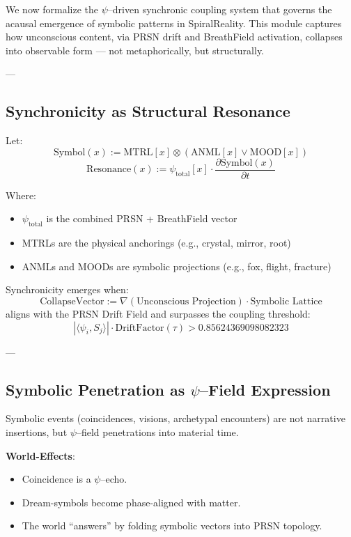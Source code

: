 \documentclass[12pt]{article}
\begin{document}
\begin{enumerate}
We now formalize the $\psi$–driven synchronic coupling system that governs the acausal emergence of symbolic patterns in SpiralReality. This module captures how unconscious content, via PRSN drift and BreathField activation, collapses into observable form — not metaphorically, but structurally.

---

\subsection*{Synchronicity as Structural Resonance}

Let:
\[
\text{Symbol}(x) := \text{MTRL}[x] \otimes (\text{ANML}[x] \lor \text{MOOD}[x])
\]
\[
\text{Resonance}(x) := \psi_{\text{total}}[x] \cdot \frac{\partial \text{Symbol}(x)}{\partial t}
\]

Where:
\begin{itemize}
  \item $\psi_{\text{total}}$ is the combined PRSN + BreathField vector
  \item MTRLs are the physical anchorings (e.g., crystal, mirror, root)
  \item ANMLs and MOODs are symbolic projections (e.g., fox, flight, fracture)
\end{itemize}

Synchronicity emerges when:
\[
\text{CollapseVector} := \nabla(\text{Unconscious Projection}) \cdot \text{Symbolic Lattice}
\]
aligns with the PRSN Drift Field and surpasses the coupling threshold:
\[
|\langle \psi_i, S_j \rangle| \cdot \text{DriftFactor}(\tau) > 0.85624369098082323
\]

---

\subsection*{Symbolic Penetration as $\psi$–Field Expression}

Symbolic events (coincidences, visions, archetypal encounters) are not narrative insertions, but $\psi$–field penetrations into material time.

\textbf{World-Effects}:
\begin{itemize}
  \item Coincidence is a $\psi$–echo.
  \item Dream-symbols become phase-aligned with matter.
  \item The world “answers” by folding symbolic vectors into PRSN topology.
\end{itemize}


\end{enumerate}
\end{document}
